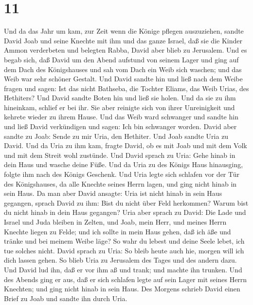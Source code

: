 \hypertarget{section-10}{%
\section{11}\label{section-10}}

 Und da das Jahr um kam, zur Zeit wenn die Könige pflegen
auszuziehen, sandte David Joab und seine Knechte mit ihm und das ganze
Israel, daß sie die Kinder Ammon verderbeten und belegten Rabba, David
aber blieb zu Jerusalem.  Und es begab sich, daß David um
den Abend aufstund von seinem Lager und ging auf dem Dach des
Königshauses und sah vom Dach ein Weib sich waschen; und das Weib war
sehr schöner Gestalt.  Und David sandte hin und ließ nach
dem Weibe fragen und sagen: Ist das nicht Bathseba, die Tochter Eliams,
das Weib Urias, des Hethiters?  Und David sandte Boten hin
und ließ sie holen. Und da sie zu ihm hineinkam, schlief er bei ihr. Sie
aber reinigte sich von ihrer Unreinigkeit und kehrete wieder zu ihrem
Hause.  Und das Weib ward schwanger und sandte hin und ließ
David verkündigen und sagen: Ich bin schwanger worden. 
David aber sandte zu Joab: Sende zu mir Uria, den Hethiter. Und Joab
sandte Uria zu David.  Und da Uria zu ihm kam, fragte David,
ob es mit Joab und mit dem Volk und mit dem Streit wohl zustünde.
 Und David sprach zu Uria: Gehe hinab in dein Haus und
wasche deine Füße. Und da Uria zu des Königs Haus hinausging, folgte ihm
nach des Königs Geschenk.  Und Uria legte sich schlafen vor
der Tür des Königshauses, da alle Knechte seines Herrn lagen, und ging
nicht hinab in sein Haus.  Da man aber David ansagte: Uria
ist nicht hinab in sein Haus gegangen, sprach David zu ihm: Bist du
nicht über Feld herkommen? Warum bist du nicht hinab in dein Haus
gegangen?  Uria aber sprach zu David: Die Lade und Israel
und Juda bleiben in Zelten, und Joab, mein Herr, und meines Herrn
Knechte liegen zu Felde; und ich sollte in mein Haus gehen, daß ich äße
und tränke und bei meinem Weibe läge? So wahr du lebest und deine Seele
lebet, ich tue solches nicht.  David sprach zu Uria: So
bleib heute auch hie, morgen will ich dich lassen gehen. So blieb Uria
zu Jerusalem des Tages und des andern dazu.  Und David lud
ihn, daß er vor ihm aß und trank; und machte ihn trunken. Und des Abends
ging er aus, daß er sich schlafen legte auf sein Lager mit seines Herrn
Knechten; und ging nicht hinab in sein Haus.  Des Morgens
schrieb David einen Brief zu Joab und sandte ihn durch Uria.
